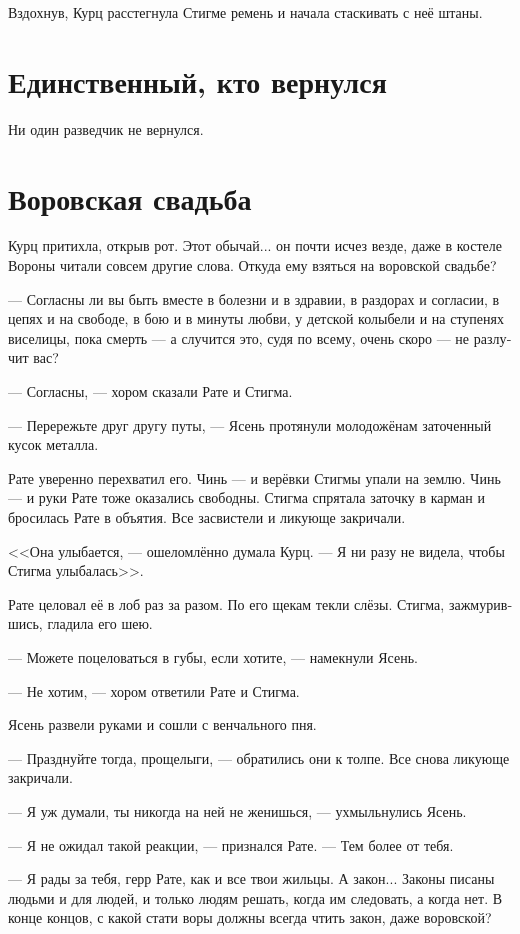 \documentclass[a4paper,12pt,fleqn]{book}\usepackage{cooltooltips}\usepackage{polyglossia}\setdefaultlanguage[babelshorthands=true]{russian}\setotherlanguage{english}\defaultfontfeatures{Ligatures=TeX,Mapping=tex-text} \usepackage{xcolor}\definecolor{lightgray}{HTML}{bbbbbb}\color{lightgray}\newcommand{\ml}[3]{\textenglish{\textcolor{black}{#3}}}
\newcommand{\asterism}{\vspace{1em}{\centering\Large\bfseries$\ast~\ast~\ast$\par}\vspace{1em}}
\begin{document}
Вздохнув, Курц расстегнула Стигме ремень и начала стаскивать с неё штаны.

\section{Единственный, кто вернулся}

Ни один разведчик не вернулся.

\section{Воровская свадьба}

Курц притихла, открыв рот.
Этот обычай... он почти исчез везде, даже в костеле Вороны читали совсем другие слова.
Откуда ему взяться на воровской свадьбе?

--- Согласны ли вы быть вместе в болезни и в здравии, в раздорах и согласии, в цепях и на свободе, в бою и в минуты любви, у детской колыбели и на ступенях виселицы, пока смерть --- а случится это, судя по всему, очень скоро --- не разлучит вас?

--- Согласны, --- хором сказали Рате и Стигма.

--- Перережьте друг другу путы, --- Ясень протянули молодожёнам заточенный кусок металла.

Рате уверенно перехватил его.
Чинь --- и верёвки Стигмы упали на землю.
Чинь --- и руки Рате тоже оказались свободны.
Стигма спрятала заточку в карман и бросилась Рате в объятия.
Все засвистели и ликующе закричали.

<<Она улыбается, --- ошеломлённо думала Курц.
--- Я ни разу не видела, чтобы Стигма улыбалась>>.

Рате целовал её в лоб раз за разом.
По его щекам текли слёзы.
Стигма, зажмурившись, гладила его шею.

--- Можете поцеловаться в губы, если хотите, --- намекнули Ясень.

--- Не хотим, --- хором ответили Рате и Стигма.

Ясень развели руками и сошли с венчального пня.

--- Празднуйте тогда, прощелыги, --- обратились они к толпе.
Все снова ликующе закричали.

\asterism

--- Я уж думали, ты никогда на ней не женишься, --- ухмыльнулись Ясень.

--- Я не ожидал такой реакции, --- признался Рате.
--- Тем более от тебя.

--- Я рады за тебя, герр Рате, как и все твои жильцы.
А закон...
Законы писаны людьми и для людей, и только людям решать, когда им следовать, а когда нет.
В конце концов, с какой стати воры должны всегда чтить закон, даже воровской?
\end{document}

